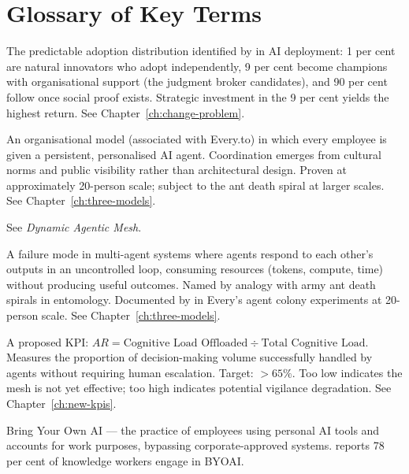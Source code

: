 \chapter{Glossary of Key Terms}
\label{ch:glossary}

\begin{description}[style=nextline, leftmargin=2em, font=\bfseries\color{navyblue}]

\item[1-9-90 Pattern]
The predictable adoption distribution identified by \textcite{BCGAgenticShift2025} in AI deployment: 1 per cent are natural innovators who adopt independently, 9 per cent become champions with organisational support (the judgment broker candidates), and 90 per cent follow once social proof exists. Strategic investment in the 9 per cent yields the highest return. See Chapter~\ref{ch:change-problem}.

\item[Agent Colony]
An organisational model (associated with Every.to) in which every employee is given a persistent, personalised AI agent. Coordination emerges from cultural norms and public visibility rather than architectural design. Proven at approximately 20-person scale; subject to the ant death spiral at larger scales. See Chapter~\ref{ch:three-models}.

\item[Agentic Mesh]
See \emph{Dynamic Agentic Mesh}.

\item[Ant Death Spiral]
A failure mode in multi-agent systems where agents respond to each other's outputs in an uncontrolled loop, consuming resources (tokens, compute, time) without producing useful outcomes. Named by analogy with army ant death spirals in entomology. Documented by \textcite{Shipper2026} in Every's agent colony experiments at 20-person scale. See Chapter~\ref{ch:three-models}.

\item[Augmentation Ratio (AR)]
A proposed KPI: $AR = \text{Cognitive Load Offloaded} \div \text{Total Cognitive Load}$. Measures the proportion of decision-making volume successfully handled by agents without requiring human escalation. Target: $>65\%$. Too low indicates the mesh is not yet effective; too high indicates potential vigilance degradation. See Chapter~\ref{ch:new-kpis}.

\item[BYOAI]
Bring Your Own AI --- the practice of employees using personal AI tools and accounts for work purposes, bypassing corporate-approved systems. \textcite{MicrosoftWorkTrend2024} reports 78 per cent of knowledge workers engage in BYOAI.


\end{description}
